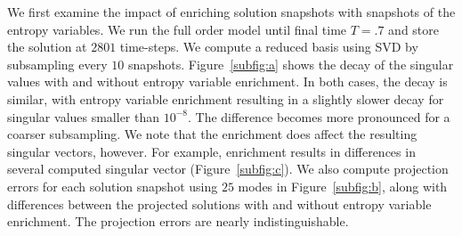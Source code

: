\documentclass[preprint,10pt]{elsarticle}
\theoremstyle{definition}
\theoremstyle{lemma}
\theoremstyle{theorem}
\theoremstyle{assumption}
\newcommand{\LRp}[1]{\left( #1 \right)}
\begin{document}
We first examine the impact of enriching solution snapshots with snapshots of the entropy variables.  We run the full order model until final time $T=.7$ and store the solution at $2801$ time-steps.  We compute a reduced basis using SVD by subsampling every $10$ snapshots.  Figure~\ref{subfig:a} shows the decay of the singular values with and without entropy variable enrichment.  In both cases, the decay is similar, with entropy variable enrichment resulting in a slightly slower decay for singular values smaller than $10^{-8}$.  The difference becomes more pronounced for a coarser subsampling.  We note that the enrichment does affect the resulting singular vectors, however.  For example, enrichment results in differences in several computed singular vector (Figure~\ref{subfig:c}).  We also compute projection errors for each solution snapshot using $25$ modes in Figure~\ref{subfig:b}, along with differences between the projected solutions with and without entropy variable enrichment.  The projection errors are nearly indistinguishable.  %
\end{document}
